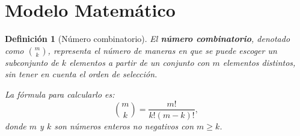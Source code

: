 \documentclass[12pt,a4paper]{book}
\newtheorem{defi}{Definición}[section]
\begin{document}
\section{Modelo Matemático}

\begin{defi}[Número combinatorio]
\label{def:combinatorio}
El \textbf{número combinatorio}, denotado como $\binom{m}{k}$, representa el número de maneras en que se puede escoger un subconjunto de $k$ elementos a partir de un conjunto con $m$ elementos distintos, sin tener en cuenta el orden de selección.

La fórmula para calcularlo es:
$$ \binom{m}{k} = \frac{m!}{k!(m-k)!},$$
donde $m$ y $k$ son números enteros no negativos con $m \ge k$.
\end{defi}




\nocite{*}


\end{document}
